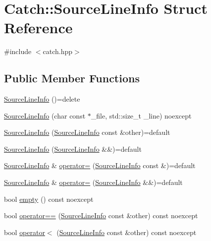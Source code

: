 \hypertarget{structCatch_1_1SourceLineInfo}{}\section{Catch\+:\+:Source\+Line\+Info Struct Reference}
\label{structCatch_1_1SourceLineInfo}


{\ttfamily \#include $<$catch.\+hpp$>$}

\subsection*{Public Member Functions}
\begin{DoxyCompactItemize}
\item 
\mbox{\hyperlink{structCatch_1_1SourceLineInfo_a2d80932bb4129b1606d1924a5c44be2f}{Source\+Line\+Info}} ()=delete
\item 
\mbox{\hyperlink{structCatch_1_1SourceLineInfo_a48510b82a39a042ab370ed143dd30c10}{Source\+Line\+Info}} (char const $\ast$\+\_\+file, std\+::size\+\_\+t \+\_\+line) noexcept
\item 
\mbox{\hyperlink{structCatch_1_1SourceLineInfo_a7c44c9986c33a9cf842b791374332d41}{Source\+Line\+Info}} (\mbox{\hyperlink{structCatch_1_1SourceLineInfo}{Source\+Line\+Info}} const \&other)=default
\item 
\mbox{\hyperlink{structCatch_1_1SourceLineInfo_a6614b503b493bbdd3b49a1bd732e0a55}{Source\+Line\+Info}} (\mbox{\hyperlink{structCatch_1_1SourceLineInfo}{Source\+Line\+Info}} \&\&)=default
\item 
\mbox{\hyperlink{structCatch_1_1SourceLineInfo}{Source\+Line\+Info}} \& \mbox{\hyperlink{structCatch_1_1SourceLineInfo_a1a6cfc0197357ef4e329bb256aa8a354}{operator=}} (\mbox{\hyperlink{structCatch_1_1SourceLineInfo}{Source\+Line\+Info}} const \&)=default
\item 
\mbox{\hyperlink{structCatch_1_1SourceLineInfo}{Source\+Line\+Info}} \& \mbox{\hyperlink{structCatch_1_1SourceLineInfo_a7fa35372f2bca5e91adc25327b7c753c}{operator=}} (\mbox{\hyperlink{structCatch_1_1SourceLineInfo}{Source\+Line\+Info}} \&\&)=default
\item 
bool \mbox{\hyperlink{structCatch_1_1SourceLineInfo_a10a5b5b7dff82971879c2eb8d83f9b3b}{empty}} () const noexcept
\item 
bool \mbox{\hyperlink{structCatch_1_1SourceLineInfo_af07e4fdeddf8409b91e4f842f6264cf8}{operator==}} (\mbox{\hyperlink{structCatch_1_1SourceLineInfo}{Source\+Line\+Info}} const \&other) const noexcept
\item 
bool \mbox{\hyperlink{structCatch_1_1SourceLineInfo_af77415416919d2d6030b4be085b92f7a}{operator$<$}} (\mbox{\hyperlink{structCatch_1_1SourceLineInfo}{Source\+Line\+Info}} const \&other) const noexcept
\end{DoxyCompactItemize}
